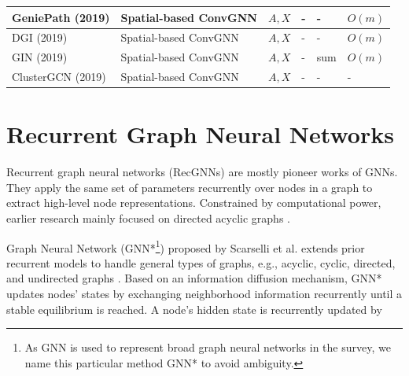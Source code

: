 \begin{table}[]
\begin{tabular}{l l l l l l }
        GeniePath (2019) \cite{liu2018geniepath} & Spatial-based ConvGNN & $A,X$ & - & - & $O(m)$  \\ \midrule
        DGI (2019) \cite{velivckovic2019deep} & Spatial-based ConvGNN & $A,X$ & - & - & $O(m)$ \\ \midrule
        GIN (2019) \cite{xu2019how} & Spatial-based ConvGNN &$A,X$ & - & sum &  $O(m)$ \\ \midrule
        ClusterGCN (2019) \cite{chiang2019cluster} & Spatial-based ConvGNN & $A,X$ & - & - & - \\ \midrule
        \end{tabular}
        \end{table}
        
    
    
	
	
    
    \section{Recurrent Graph Neural Networks}
    \label{sec:grn}
    Recurrent graph neural networks (RecGNNs) are mostly pioneer works of GNNs.  They apply the same set of parameters recurrently over nodes in a graph to extract high-level node representations. Constrained by computational power, earlier research mainly focused on directed acyclic graphs \cite{sperduti1997supervised,micheli2004contextual}.%
    

    Graph Neural Network (GNN*\footnote{As GNN is used to represent broad graph neural networks in the survey, we name this particular method GNN* to avoid ambiguity.}) proposed by Scarselli et al. extends prior recurrent models to handle general types of graphs, e.g., acyclic, cyclic, directed, and undirected graphs \cite{scarselli2009graph}.  Based on an information diffusion mechanism, GNN* updates nodes' states by exchanging neighborhood information recurrently until a stable equilibrium is reached.  A node's hidden state is recurrently updated by
    
    
